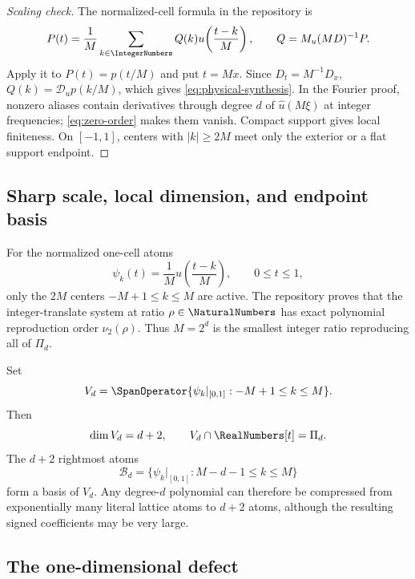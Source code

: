 \documentclass[11pt,oneside]{article}
\numberwithin{equation}{section}
\theoremstyle{definition}
\theoremstyle{remark}
\newcommand{\M}{M_u}
\newcommand{\Dscr}{\mathscr D_u}
\begin{document}
\begin{proof}[Scaling check]
The normalized-cell formula in the repository is
\[
 P(t)=\frac1M\sum_{k\in\IntegerNumbers}Q(k)u\!\left(\frac{t-k}{M}\right),
 \qquad Q=\M(MD)^{-1}P.
\]
Apply it to $P(t)=p(t/M)$ and put $t=Mx$.  Since $D_t=M^{-1}D_x$,
$Q(k)=\Dscr p(k/M)$, which gives \eqref{eq:physical-synthesis}.  In the
Fourier proof, nonzero aliases contain derivatives through degree $d$ of
$\widehat u(M\xi)$ at integer frequencies; \eqref{eq:zero-order} makes them
vanish.  Compact support gives local finiteness.  On $[-1,1]$, centers with
$|k|\ge2M$ meet only the exterior or a flat support endpoint.
\end{proof}

\subsection{Sharp scale, local dimension, and endpoint basis}

For the normalized one-cell atoms
\begin{equation}
 \psi_k(t)=\frac1M u\!\left(\frac{t-k}{M}\right),
 \qquad 0\le t\le1,
 \label{eq:cell-atoms}
\end{equation}
only the $2M$ centers $-M+1\le k\le M$ are active.  The repository proves that
the integer-translate system at ratio $\rho\in\NaturalNumbers$ has exact polynomial
reproduction order $\nu_2(\rho)$.  Thus $M=2^d$ is the smallest integer ratio
reproducing all of $\Pi_d$.

Set
\begin{equation}
 V_d=\SpanOperator\{\psi_k|_{[0,1]}:-M+1\le k\le M\}.
 \label{eq:Vd}
\end{equation}
Then
\begin{equation}
 \dim V_d=d+2,\qquad V_d\cap\RealNumbers[t]=\Pi_d.
 \label{eq:local-dimension}
\end{equation}
The $d+2$ rightmost atoms
\begin{equation}
 \mathcal B_d=\{\psi_k|_{[0,1]}:M-d-1\le k\le M\}
 \label{eq:endpoint-basis}
\end{equation}
form a basis of $V_d$.  Any degree-$d$ polynomial can therefore be compressed
from exponentially many literal lattice atoms to $d+2$ atoms, although the
resulting signed coefficients may be very large.

\subsection{The one-dimensional defect}
\end{document}

